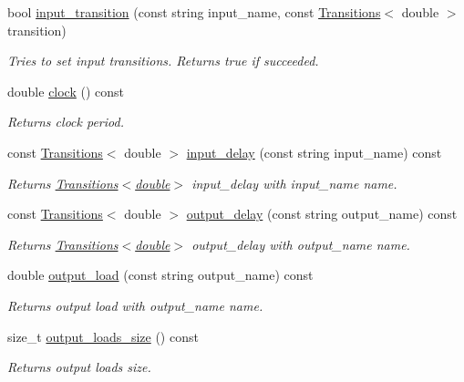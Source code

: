 \begin{DoxyCompactItemize}
bool \hyperlink{classDesign__Constraints_afd86c8844a5a62d1a6bbd7138d548cf9}{input\-\_\-transition} (const string input\-\_\-name, const \hyperlink{classTransitions}{Transitions}$<$ double $>$ transition)
\begin{DoxyCompactList}\small\item\em Tries to set input transitions. Returns true if succeeded. \end{DoxyCompactList}\item 
double \hyperlink{classDesign__Constraints_a535cc6d955b52c959b566510c1e3544a}{clock} () const 
\begin{DoxyCompactList}\small\item\em Returns clock period. \end{DoxyCompactList}\item 
const \hyperlink{classTransitions}{Transitions}$<$ double $>$ \hyperlink{classDesign__Constraints_ae67988a0cd0ba0ab5ad1463c273eb287}{input\-\_\-delay} (const string input\-\_\-name) const 
\begin{DoxyCompactList}\small\item\em Returns \hyperlink{classTransitions}{Transitions$<$double$>$} input\-\_\-delay with input\-\_\-name name. \end{DoxyCompactList}\item 
const \hyperlink{classTransitions}{Transitions}$<$ double $>$ \hyperlink{classDesign__Constraints_a07810050c6ae8a62d1e77ee23ad1f660}{output\-\_\-delay} (const string output\-\_\-name) const 
\begin{DoxyCompactList}\small\item\em Returns \hyperlink{classTransitions}{Transitions$<$double$>$} output\-\_\-delay with output\-\_\-name name. \end{DoxyCompactList}\item 
double \hyperlink{classDesign__Constraints_ab21387336a70852447a1d16e11358840}{output\-\_\-load} (const string output\-\_\-name) const 
\begin{DoxyCompactList}\small\item\em Returns output load with output\-\_\-name name. \end{DoxyCompactList}\item 
size\-\_\-t \hyperlink{classDesign__Constraints_a840bdfc3346651f9925ef35590f8c55b}{output\-\_\-loads\-\_\-size} () const 
\begin{DoxyCompactList}\small\item\em Returns output loads size. \end{DoxyCompactList}\item 

\end{DoxyCompactItemize}

